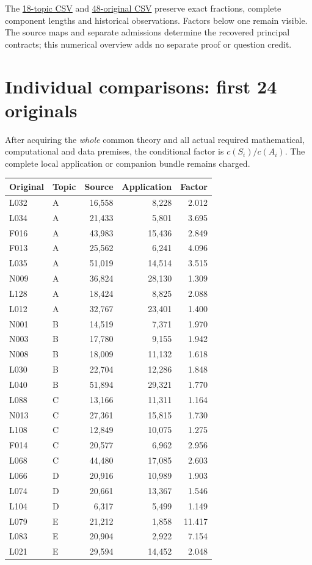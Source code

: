 \documentclass[11pt,a4paper]{article}
\begin{document}
The \href{topics.csv}{18-topic CSV} and \href{applications.csv}{48-original CSV} preserve exact fractions, complete component lengths and historical observations. Factors below one remain visible. The source maps and separate admissions determine the recovered principal contracts; this numerical overview adds no separate proof or question credit.
\newpage
\section*{Individual comparisons: first 24 originals}
After acquiring the \emph{whole} common theory and all actual required mathematical, computational and data premises, the conditional factor is $c(S_i)/c(A_i)$. The complete local application or companion bundle remains charged.
\begin{center}\small\begin{tabular}{llrrr}\toprule
Original & Topic & Source & Application & Factor\\\midrule
L032 & A & 16,558 & 8,228 & 2.012 \\
L034 & A & 21,433 & 5,801 & 3.695 \\
F016 & A & 43,983 & 15,436 & 2.849 \\
F013 & A & 25,562 & 6,241 & 4.096 \\
L035 & A & 51,019 & 14,514 & 3.515 \\
N009 & A & 36,824 & 28,130 & 1.309 \\
L128 & A & 18,424 & 8,825 & 2.088 \\
L012 & A & 32,767 & 23,401 & 1.400 \\
N001 & B & 14,519 & 7,371 & 1.970 \\
N003 & B & 17,780 & 9,155 & 1.942 \\
N008 & B & 18,009 & 11,132 & 1.618 \\
L030 & B & 22,704 & 12,286 & 1.848 \\
L040 & B & 51,894 & 29,321 & 1.770 \\
L088 & C & 13,166 & 11,311 & 1.164 \\
N013 & C & 27,361 & 15,815 & 1.730 \\
L108 & C & 12,849 & 10,075 & 1.275 \\
F014 & C & 20,577 & 6,962 & 2.956 \\
L068 & C & 44,480 & 17,085 & 2.603 \\
L066 & D & 20,916 & 10,989 & 1.903 \\
L074 & D & 20,661 & 13,367 & 1.546 \\
L104 & D & 6,317 & 5,499 & 1.149 \\
L079 & E & 21,212 & 1,858 & 11.417 \\
L083 & E & 20,904 & 2,922 & 7.154 \\
L021 & E & 29,594 & 14,452 & 2.048 \\\bottomrule\end{tabular}\end{center}
\end{document}
